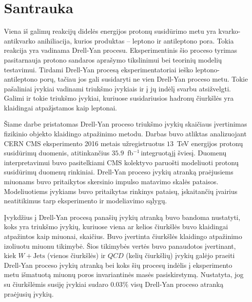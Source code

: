 \documentclass[a4paper, 12pt, oneside]{article}
\newcommand{\WJets}{W\! +\!\mathrm{Jets}}
\newcommand{\invfb}{fb$^{-1}\,$}
\newcommand{\QCD}{QC\! D}
\begin{document}
\vspace{2cm}




\section*{Santrauka}
Viena iš galimų reakcijų didelės energijos protonų susidūrimo metu yra kvarko-antikvarko anihiliacija, kurios
produktas -- leptono ir antileptono pora.
Tokia reakcija yra vadinama Drell-Yan procesu.
Eksperimentinis šio proceso tyrimas pasitarnauja protono sandaros aprašymo tikslinimui bei teorinių modelių testavimui.
Tirdami Drell-Yan procesą eksperimentatoriai ieško leptono-antileptono porų, tačiau jos gali susidaryti ne vien
Drell-Yan proceso metu.
Tokie pašaliniai įvykiai vadinami triukšmo įvykiais ir į jų indėlį svarbu atsižvelgti.
Galimi ir tokie triukšmo įvykiai, kuriuose susidariusios hadronų čiurkšlės yra klaidingai atpažįstamos kaip leptonai.

Šiame darbe pristatomas Drell-Yan proceso triukšmo įvykių skaičiaus įvertinimas fizikinio objekto klaidingo
atpažinimo metodu.
Darbas buvo atliktas analizuojant CERN CMS eksperimento 2016 metais užregistruotus
$13$~TeV energijos protonų susidūrimų duomenis, atitinkančius $35.9$~\invfb integruotąjį šviesį.
Duomenų interpretavimui buvo pasitelkiami CMS kolektyvo paruošti modeliuoti protonų susidūrimų duomenų rinkiniai.
Drell-Yan proceso įvykių atranką praėjusiems miuonams buvo pritaikytos skersinio impulso matavimo skalės pataisos.
Modeliuotiems įvykiams buvo pritaikytas rinkinys pataisų, įskaitančių įvairius neatitikimus tarp eksperimento
ir modeliavimo sąlygų.

Įvykdžius į Drell-Yan procesą panašių įvykių atranką buvo bandoma nustatyti, koks yra triukšmo įvykių, kuriuose
viena ar kelios čiurkšlės buvo klaidingai atpažintos kaip miuonai, skaičius.
Buvo įvertinta čiurkšlės klaidingo atpažinimo izoliuotu miuonu tikimybė.
Šios tikimybės vertės buvo panaudotos įvertinant, kiek $\WJets$ (vienos čiurkšlės) ir $\QCD$ (kelių čiurkšlių)
įvykių galėjo praeiti Drell-Yan proceso įvykių atranką bei koks šių procesų indėlis į eksperimento metu
išmatuotą miuonų poros invariantinės masės pasiskirstymą.
Nustatyta, jog su čiurkšlėmis susiję įvykiai sudaro $0.03\%$ visų Drell-Yan proceso atranką praėjusių įvykių.
\end{document}
